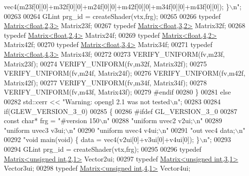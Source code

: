 \begin{DoxyCode}
{       vec4(m23f[0][0]+m32f[0][0]+m24f[0][0]+m42f[0][0]+m34f[0][0]+m43f[0][0]); \}\(\backslash\)n"};
00263         
00264       GLint prg\_id = createShader(vtx,frg);
00265       
00266       \textcolor{keyword}{typedef} \hyperlink{group___core___module_class_eigen_1_1_matrix}{Matrix<float,2,3>} Matrix23f;
00267       \textcolor{keyword}{typedef} \hyperlink{group___core___module_class_eigen_1_1_matrix}{Matrix<float,3,2>} Matrix32f;
00268       \textcolor{keyword}{typedef} \hyperlink{group___core___module_class_eigen_1_1_matrix}{Matrix<float,2,4>} Matrix24f;
00269       \textcolor{keyword}{typedef} \hyperlink{group___core___module_class_eigen_1_1_matrix}{Matrix<float,4,2>} Matrix42f;
00270       \textcolor{keyword}{typedef} \hyperlink{group___core___module_class_eigen_1_1_matrix}{Matrix<float,3,4>} Matrix34f;
00271       \textcolor{keyword}{typedef} \hyperlink{group___core___module_class_eigen_1_1_matrix}{Matrix<float,4,3>} Matrix43f;
00272       
00273       VERIFY\_UNIFORM(fv,m23f, Matrix23f);
00274       VERIFY\_UNIFORM(fv,m32f, Matrix32f);
00275       VERIFY\_UNIFORM(fv,m24f, Matrix24f);
00276       VERIFY\_UNIFORM(fv,m42f, Matrix42f);
00277       VERIFY\_UNIFORM(fv,m34f, Matrix34f);
00278       VERIFY\_UNIFORM(fv,m43f, Matrix43f);
00279 \textcolor{preprocessor}{      #endif}
00280     \}
00281     \textcolor{keywordflow}{else}
00282       std::cerr << \textcolor{stringliteral}{"Warning: opengl 2.1 was not tested\(\backslash\)n"};
00283     
00284     \textcolor{keywordflow}{if}(GLEW\_VERSION\_3\_0)
00285     \{
00286 \textcolor{preprocessor}{      #ifdef GL\_VERSION\_3\_0}
00287       \textcolor{keyword}{const} \textcolor{keywordtype}{char}* frg = \textcolor{stringliteral}{"#version 150\(\backslash\)n"}
00288         \textcolor{stringliteral}{"uniform uvec2 v2ui;\(\backslash\)n"}
00289         \textcolor{stringliteral}{"uniform uvec3 v3ui;\(\backslash\)n"}
00290         \textcolor{stringliteral}{"uniform uvec4 v4ui;\(\backslash\)n"}
00291         \textcolor{stringliteral}{"out vec4 data;\(\backslash\)n"}
00292         \textcolor{stringliteral}{"void main(void) \{ data = vec4(v2ui[0]+v3ui[0]+v4ui[0]); \}\(\backslash\)n"};
00293         
00294       GLint prg\_id = createShader(vtx,frg);
00295       
00296       \textcolor{keyword}{typedef} \hyperlink{group___core___module_class_eigen_1_1_matrix}{Matrix<unsigned int,2,1>} Vector2ui;
00297       \textcolor{keyword}{typedef} \hyperlink{group___core___module_class_eigen_1_1_matrix}{Matrix<unsigned int,3,1>} Vector3ui;
00298       \textcolor{keyword}{typedef} \hyperlink{group___core___module_class_eigen_1_1_matrix}{Matrix<unsigned int,4,1>} Vector4ui;

\end{DoxyCode}
